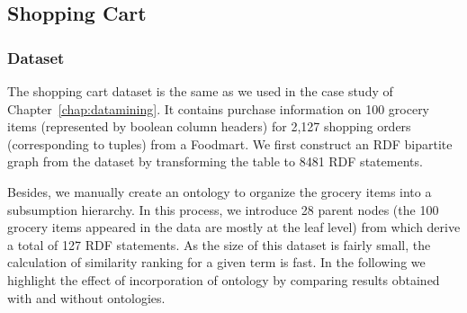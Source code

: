 \subsection{Shopping Cart}
\subsubsection{Dataset}
The shopping cart dataset is the same as we used in the case study of Chapter~\ref{chap:datamining}. It contains purchase information on 100 grocery items (represented by boolean column headers) for 2,127 shopping orders (corresponding to tuples) from a Foodmart. We first construct an RDF bipartite graph from the dataset by transforming the table to 8481 RDF statements.

Besides, we manually create an ontology to organize the grocery items into a subsumption hierarchy. In this process, we introduce 28 parent nodes (the 100 grocery items appeared in the data are mostly at the leaf level) from which derive a total of 127 RDF statements. As the size of this dataset is fairly small, the calculation of similarity ranking for a given term is fast. In the following we highlight the effect of incorporation of ontology by comparing results obtained with and without ontologies.


